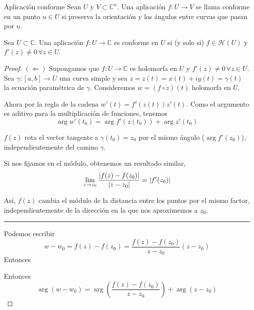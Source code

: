 \begin{definition}{Aplicación conforme}
    Sean $U$ y $V \subset \mathbb{C}^n$. Una aplicación $f: U \rightarrow V$ se llama conforme en un punto $u \in U$ si preserva la orientación y los ángulos entre curvas que pasan por $u$.
\end{definition}

\begin{prop}
    Sea $U \subset \mathbb{C}$. Una aplicación $f: U \rightarrow \mathbb{C}$ es conforme en $U$ si (y solo si) $f \in \mathcal{H}(U)$ y $f'(z) \not = 0 \, \forall z \in U$.
\end{prop}

\begin{proof}
    $(\Leftarrow)$ Supongamos que $f: U \rightarrow \mathbb{C}$ es holomorfa en $U$ y $f'(z) \not = 0 \, \forall z \in U$. Sea $\gamma: [a,b] \rightarrow U$ una curva simple y sea $z = z(t) = x(t) + iy(t) = \gamma (t)$ la ecuación paramétrica de $\gamma$. Consideremos $w = (f \circ  z)(t)$ holomorfa en $U$.

    Ahora por la regla de la cadena $w'(t) = f'(z(t))z'(t)$. Como el argumento es aditivo para la multiplicación de funciones, tenemos
    \begin{equation*}
        \arg{w'(t_0)} = \arg{f'(z(t_0))} + \arg{z'(t_0)}
    \end{equation*}

    $f(z)$ rota el vector tangente a $\gamma(t_0) = z_0$ por el mismo ángulo ($\arg{f'(z_0)}$), independientemente del camino $\gamma$.

    Si nos fijamos en el módulo, obtenemos un resultado similar,
    \begin{equation*}
        \lim_{z \rightarrow z_0} \dfrac{\left\lvert f(z) - f(z_0)\right\rvert}{\left\lvert z - z_0\right\rvert} = \left\lvert f'(z_0)\right\rvert
    \end{equation*}

    Así, $f(z)$ cambia el módulo de la distancia entre los puntos por el mismo factor, independientemente de la dirección en la que nos aproximemos a $z_0$. \\

    \noindent\rule{8cm}{0.4pt}

    Podemos escribir
    \begin{equation*}
        w - w_0 = f(z) - f(z_0) = \dfrac{f(z)-f(z_0)}{z - z_0} (z - z_0)
    \end{equation*}Entonces

    Entonces
    \begin{equation*}
        \arg{(w - w_0)} =  \arg{ \left( \dfrac{f(z)-f(z_0)}{z - z_0} \right)} + \arg{(z - z_0)}
    \end{equation*}


\end{proof}
